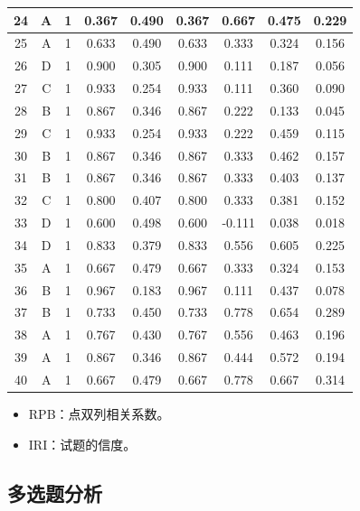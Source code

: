 \documentclass[hyperref,adobefonts]{ctexart}
\providecommand{\tightlist}{\setlength{\itemsep}{0pt}\setlength{\parskip}{0pt}}
\begin{document}
\begin{longtable}{c|c|c|c|c|c|c|c|c}
\hline
24 & A & 1 & 0.367 & 0.490 & 0.367 & 0.667 & 0.475 & 0.229\\
\hline
25 & A & 1 & 0.633 & 0.490 & 0.633 & 0.333 & 0.324 & 0.156\\
\hline
26 & D & 1 & 0.900 & 0.305 & 0.900 & 0.111 & 0.187 & 0.056\\
\hline
27 & C & 1 & 0.933 & 0.254 & 0.933 & 0.111 & 0.360 & 0.090\\
\hline
28 & B & 1 & 0.867 & 0.346 & 0.867 & 0.222 & 0.133 & 0.045\\
\hline
29 & C & 1 & 0.933 & 0.254 & 0.933 & 0.222 & 0.459 & 0.115\\
\hline
30 & B & 1 & 0.867 & 0.346 & 0.867 & 0.333 & 0.462 & 0.157\\
\hline
31 & B & 1 & 0.867 & 0.346 & 0.867 & 0.333 & 0.403 & 0.137\\
\hline
32 & C & 1 & 0.800 & 0.407 & 0.800 & 0.333 & 0.381 & 0.152\\
\hline
33 & D & 1 & 0.600 & 0.498 & 0.600 & -0.111 & 0.038 & 0.018\\
\hline
34 & D & 1 & 0.833 & 0.379 & 0.833 & 0.556 & 0.605 & 0.225\\
\hline
35 & A & 1 & 0.667 & 0.479 & 0.667 & 0.333 & 0.324 & 0.153\\
\hline
36 & B & 1 & 0.967 & 0.183 & 0.967 & 0.111 & 0.437 & 0.078\\
\hline
37 & B & 1 & 0.733 & 0.450 & 0.733 & 0.778 & 0.654 & 0.289\\
\hline
38 & A & 1 & 0.767 & 0.430 & 0.767 & 0.556 & 0.463 & 0.196\\
\hline
39 & A & 1 & 0.867 & 0.346 & 0.867 & 0.444 & 0.572 & 0.194\\
\hline
40 & A & 1 & 0.667 & 0.479 & 0.667 & 0.778 & 0.667 & 0.314\\
\hline
\end{longtable}

\begin{itemize}
\tightlist
\item
  RPB：点双列相关系数。
\item
  IRI：试题的信度。
\end{itemize}

\subsection{多选题分析}
\end{document}
